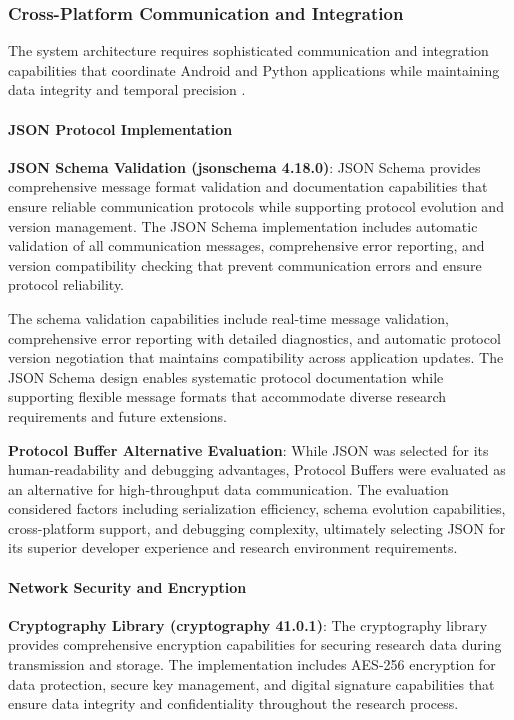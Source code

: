 \documentclass[12pt,a4paper]{article}
\begin{document}
\subsubsection{Cross-Platform Communication and Integration}

The system architecture requires sophisticated communication and integration capabilities that coordinate Android and
Python applications while maintaining data integrity and temporal precision .

\paragraph{JSON Protocol Implementation}

\textbf{JSON Schema Validation (jsonschema 4.18.0)}: JSON Schema provides comprehensive message format validation and
documentation capabilities that ensure reliable communication protocols while supporting protocol evolution and version
management. The JSON Schema implementation includes automatic validation of all communication messages, comprehensive
error reporting, and version compatibility checking that prevent communication errors and ensure protocol reliability.

The schema validation capabilities include real-time message validation, comprehensive error reporting with detailed
diagnostics, and automatic protocol version negotiation that maintains compatibility across application updates. The
JSON Schema design enables systematic protocol documentation while supporting flexible message formats that accommodate
diverse research requirements and future extensions.

\textbf{Protocol Buffer Alternative Evaluation}: While JSON was selected for its human-readability and debugging advantages,
Protocol Buffers were evaluated as an alternative for high-throughput data communication. The evaluation considered
factors including serialization efficiency, schema evolution capabilities, cross-platform support, and debugging
complexity, ultimately selecting JSON for its superior developer experience and research environment requirements.

\paragraph{Network Security and Encryption}

\textbf{Cryptography Library (cryptography 41.0.1)}: The cryptography library provides comprehensive encryption capabilities
for securing research data during transmission and storage. The implementation includes AES-256 encryption for data
protection, secure key management, and digital signature capabilities that ensure data integrity and confidentiality
throughout the research process.
\end{document}
